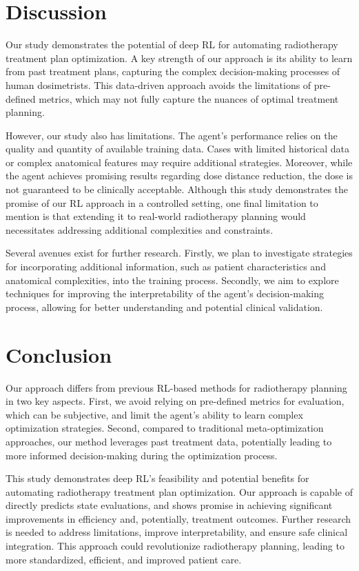 \section{Discussion}
Our study demonstrates the potential of deep RL for automating radiotherapy treatment plan optimization.
A key strength of our approach is its ability to learn from past treatment plans, capturing the complex decision-making processes of human dosimetrists.
This data-driven approach avoids the limitations of pre-defined metrics, which may not fully capture the nuances of optimal treatment planning.

However, our study also has limitations.
The agent's performance relies on the quality and quantity of available training data.
Cases with limited historical data or complex anatomical features may require additional strategies.
Moreover, while the agent achieves promising results regarding dose distance reduction, the dose is not guaranteed to be clinically acceptable.
Although this study demonstrates the promise of our RL approach in a controlled setting, one final limitation to mention is that extending it to real-world radiotherapy planning would necessitates addressing additional complexities and constraints.

Several avenues exist for further research.
Firstly, we plan to investigate strategies for incorporating additional information, such as patient characteristics and anatomical complexities, into the training process.
Secondly, we aim to explore techniques for improving the interpretability of the agent's decision-making process, allowing for better understanding and potential clinical validation.

\section{Conclusion}
Our approach differs from previous RL-based methods for radiotherapy planning in two key aspects.
First, we avoid relying on pre-defined metrics for evaluation, which can be subjective, and limit the agent's ability to learn complex optimization strategies.
Second, compared to traditional meta-optimization approaches, our method leverages past treatment data, potentially leading to more informed decision-making during the optimization process.

This study demonstrates deep RL's feasibility and potential benefits for automating radiotherapy treatment plan optimization.
Our approach is capable of directly predicts state evaluations, and shows promise in achieving significant improvements in efficiency and, potentially, treatment outcomes.
Further research is needed to address limitations, improve interpretability, and ensure safe clinical integration.
This approach could revolutionize radiotherapy planning, leading to more standardized, efficient, and improved patient care.

